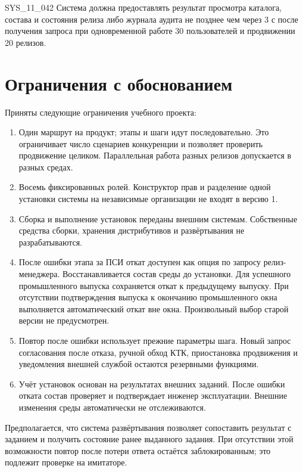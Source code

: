 \documentclass{tpks}
\begin{document}
\begin{req}{SYS_11_04}{2}
Система должна предоставлять результат просмотра каталога, состава и состояния релиза либо журнала аудита не позднее чем через 3 с после получения запроса при одновременной работе 30 пользователей и продвижении 20 релизов.
\end{req}

\section{Ограничения с обоснованием}

Приняты следующие ограничения учебного проекта:
\begin{enumerate}
\item Один маршрут на продукт; этапы и шаги идут последовательно.
Это ограничивает число сценариев конкуренции и позволяет проверить продвижение целиком.
Параллельная работа разных релизов допускается в разных средах.
\item Восемь фиксированных ролей. Конструктор прав и разделение одной установки системы
на независимые организации не входят в версию 1.
\item Сборка и выполнение установок переданы внешним системам. Собственные средства
сборки, хранения дистрибутивов и развёртывания не разрабатываются.
\item После ошибки этапа за ПСИ откат доступен как опция по запросу релиз-менеджера.
Восстанавливается состав среды до установки. Для успешного промышленного выпуска
сохраняется откат к предыдущему выпуску. При отсутствии подтверждения выпуска
к окончанию промышленного окна выполняется автоматический откат вне окна.
Произвольный выбор старой версии не предусмотрен.
\item Повтор после ошибки использует прежние параметры шага. Новый запрос согласования
после отказа, ручной обход КТК, приостановка продвижения и уведомления внешней службой
остаются резервными функциями.
\item Учёт установок основан на результатах внешних заданий. После ошибки отката
состав проверяет и подтверждает инженер эксплуатации. Внешние изменения среды
автоматически не отслеживаются.
\end{enumerate}

Предполагается, что система развёртывания позволяет сопоставить результат с заданием
и получить состояние ранее выданного задания. При отсутствии этой возможности повтор
после потери ответа остаётся заблокированным; это подлежит проверке на имитаторе.

\clearpage
\end{document}
